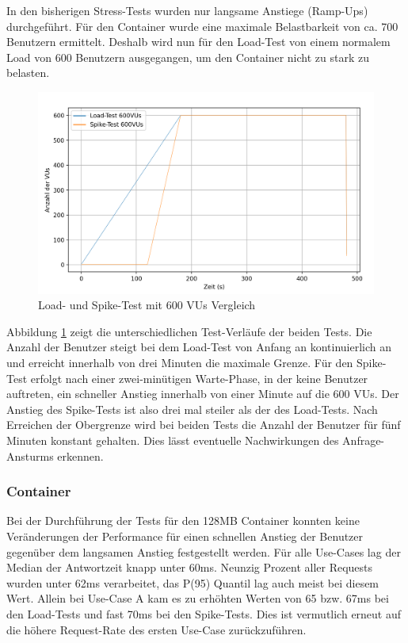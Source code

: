 In den bisherigen Stress-Tests wurden nur langsame Anstiege (Ramp-Ups) durchgeführt. Für den Container wurde eine maximale Belastbarkeit von ca. 700 Benutzern ermittelt. Deshalb wird nun für den Load-Test von einem normalem Load von 600 Benutzern ausgegangen, um den Container nicht zu stark zu belasten.

\begin{figure}[H]
    \includegraphics[width=\textwidth]{img/load600-vs-spike600.png}
    \caption[Load- und Spike-Test mit 600 VUs Vergleich]{Load- und Spike-Test mit 600 VUs Vergleich}
    \label{fig:load600-vs-spike600}
\end{figure}

Abbildung \ref{fig:load600-vs-spike600} zeigt die unterschiedlichen Test-Verläufe der beiden Tests. Die Anzahl der Benutzer steigt bei dem Load-Test von Anfang an kontinuierlich an und erreicht innerhalb von drei Minuten die maximale Grenze. Für den Spike-Test erfolgt nach einer zwei-minütigen Warte-Phase, in der keine Benutzer auftreten, ein schneller Anstieg innerhalb von einer Minute auf die 600 \acp{VU}. Der Anstieg des Spike-Tests ist also drei mal steiler als der des Load-Tests. 
Nach Erreichen der Obergrenze wird bei beiden Tests die Anzahl der Benutzer für fünf Minuten konstant gehalten. Dies lässt eventuelle Nachwirkungen des Anfrage-Ansturms erkennen.


\subsubsection{Container}
Bei der Durchführung der Tests für den 128MB Container konnten keine Veränderungen der Performance für einen schnellen Anstieg der Benutzer gegenüber dem langsamen Anstieg festgestellt werden. Für alle Use-Cases lag der Median der Antwortzeit knapp unter 60ms. Neunzig Prozent aller Requests wurden unter 62ms verarbeitet, das P(95) Quantil lag auch meist bei diesem Wert. Allein bei Use-Case A kam es zu erhöhten Werten von 65 bzw. 67ms bei den Load-Tests und fast 70ms bei den Spike-Tests. Dies ist vermutlich erneut auf die höhere Request-Rate des ersten Use-Case zurückzuführen.

